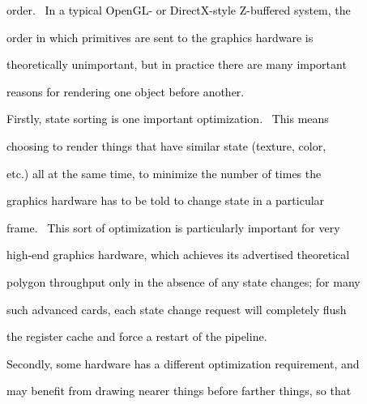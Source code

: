 \documentclass[a4paper]{article}
\newcommand\textstyleOOoComputerKeyWord[1]{\textrm{\textcolor[rgb]{0.0,0.0,0.5019608}{#1}}}
\begin{document}
{\color{black}
\textstyleOOoComputerKeyWord{\textcolor{black}{order. \ In a typical OpenGL- or DirectX-style Z-buffered system, the}}}

{\color{black}
\textstyleOOoComputerKeyWord{\textcolor{black}{order in which primitives are sent to the graphics hardware is}}}

{\color{black}
\textstyleOOoComputerKeyWord{\textcolor{black}{theoretically unimportant, but in practice there are many important}}}

{\color{black}
\textstyleOOoComputerKeyWord{\textcolor{black}{reasons for rendering one object before another.}}}


\bigskip

{\color{black}
\textstyleOOoComputerKeyWord{\textcolor{black}{Firstly, state sorting is one important optimization. \ This means}}}

{\color{black}
\textstyleOOoComputerKeyWord{\textcolor{black}{choosing to render things that have similar state (texture, color,}}}

{\color{black}
\textstyleOOoComputerKeyWord{\textcolor{black}{etc.) all at the same time, to minimize the number of times the}}}

{\color{black}
\textstyleOOoComputerKeyWord{\textcolor{black}{graphics hardware has to be told to change state in a particular}}}

{\color{black}
\textstyleOOoComputerKeyWord{\textcolor{black}{frame. \ This sort of optimization is particularly important for very}}}

{\color{black}
\textstyleOOoComputerKeyWord{\textcolor{black}{high-end graphics hardware, which achieves its advertised theoretical}}}

{\color{black}
\textstyleOOoComputerKeyWord{\textcolor{black}{polygon throughput only in the absence of any state changes; for many}}}

{\color{black}
\textstyleOOoComputerKeyWord{\textcolor{black}{such advanced cards, each state change request will completely flush}}}

{\color{black}
\textstyleOOoComputerKeyWord{\textcolor{black}{the register cache and force a restart of the pipeline.}}}


\bigskip

{\color{black}
\textstyleOOoComputerKeyWord{\textcolor{black}{Secondly, some hardware has a different optimization requirement, and}}}

{\color{black}
\textstyleOOoComputerKeyWord{\textcolor{black}{may benefit from drawing nearer things before farther things, so that}}}
\end{document}
